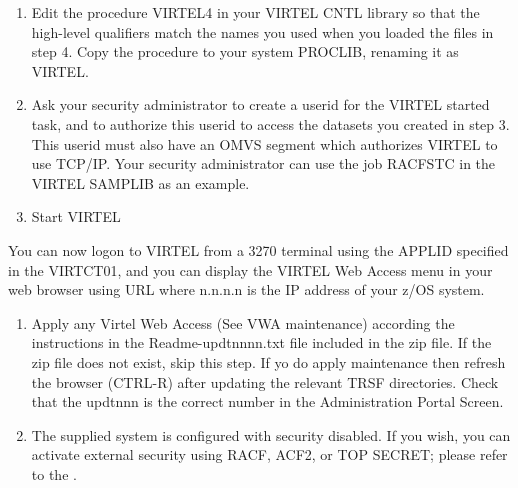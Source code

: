 \documentclass[letterpaper,10pt,english]{sphinxmanual}
\begin{document}
\begin{sphinxVerbatim}[commandchars=\\\{\}]
 
\end{sphinxVerbatim}
\begin{enumerate}
\def\theenumi{\arabic{enumi}}
\def\labelenumi{\theenumi .}
\makeatletter\def\p@enumii{\p@enumi \theenumi .}\makeatother
\setcounter{enumi}{11}
\item {} 
Edit the procedure VIRTEL4 in your VIRTEL CNTL library so that the high-level qualifiers match the names you used when you loaded the files in step 4. Copy the procedure to your system PROCLIB, renaming it as VIRTEL.

\item {} 
Ask your security administrator to create a userid for the VIRTEL started task, and to authorize this userid to access the datasets you created in step 3. This userid must also have an OMVS segment which authorizes VIRTEL to use TCP/IP. Your security administrator can use the job RACFSTC in the VIRTEL SAMPLIB as an example.

\item {} 
Start VIRTEL

\end{enumerate}

You can now logon to VIRTEL from a 3270 terminal using the APPLID specified in the VIRTCT01, and you can display the VIRTEL Web Access menu in your web browser using URL  where n.n.n.n is the IP address of your z/OS system.
\begin{enumerate}
\def\theenumi{\arabic{enumi}}
\def\labelenumi{\theenumi .}
\makeatletter\def\p@enumii{\p@enumi \theenumi .}\makeatother
\setcounter{enumi}{14}
\item {} 
Apply any Virtel Web Access (See VWA maintenance) according the instructions in the Readme-updtnnnn.txt file included in the zip file. If the zip file does not exist, skip this step. If yo do apply maintenance then refresh the browser (CTRL-R) after updating the relevant TRSF directories. Check that the updtnnn is the correct number in the Administration Portal Screen.

\item {} 
The supplied system is configured with security disabled. If you wish, you can activate external security using RACF, ACF2, or TOP SECRET; please refer to the {\hyperref[\detokenize{Installation_Guide:vvrrig-security}]{}}.

\end{enumerate}
\end{document}
